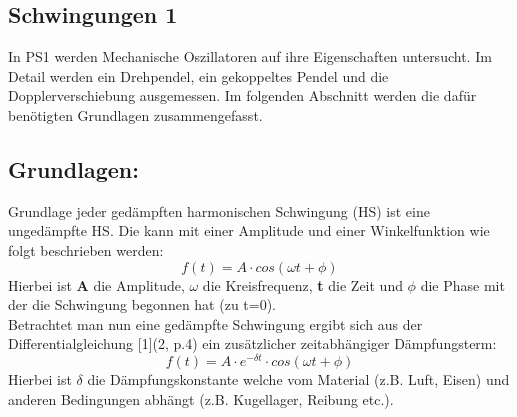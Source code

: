 \documentclass[12pt,a4paper]{article}
\begin{document}
\begin{multicols}{2}




%			




\section{Schwingungen 1}
In PS1 werden Mechanische Oszillatoren auf ihre Eigenschaften untersucht.
Im Detail werden ein Drehpendel, ein gekoppeltes Pendel und die Dopplerverschiebung ausgemessen. Im folgenden Abschnitt werden die dafür benötigten Grundlagen zusammengefasst.

\subsection{Grundlagen:}
Grundlage jeder gedämpften harmonischen Schwingung (HS) ist eine ungedämpfte HS. Die kann mit einer Amplitude und einer Winkelfunktion wie folgt beschrieben werden:
$$f(t) = A \cdot cos(\omega t + \phi)$$
Hierbei ist \textbf{A} die Amplitude, \textbf{$\omega$} die Kreisfrequenz, \textbf{t} die Zeit und \textbf{$\phi$} die Phase mit der die Schwingung begonnen hat (zu t=0).\\
Betrachtet man nun eine gedämpfte Schwingung ergibt sich aus der Differentialgleichung [1](2, p.4) ein zusätzlicher zeitabhängiger Dämpfungsterm: 
$$f(t) = A \cdot e^{- \delta t} \cdot cos(\omega t + \phi)$$ 
Hierbei ist $\delta$ die Dämpfungskonstante welche vom Material (z.B. Luft, Eisen) und anderen Bedingungen abhängt (z.B. Kugellager, Reibung etc.).\\


\end{multicols}
\end{document}
